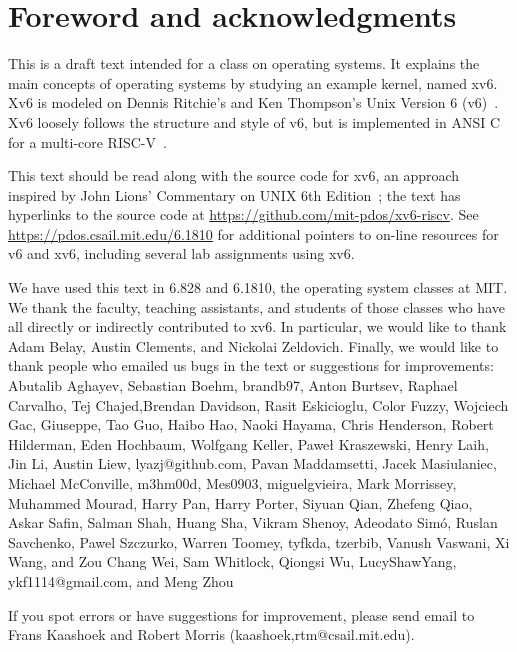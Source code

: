 \chapter*{Foreword and acknowledgments}


This is a draft text intended for a class on operating systems. It
explains the main concepts of operating systems by studying an example
kernel, named xv6.  Xv6 is modeled on Dennis Ritchie's and
Ken Thompson's Unix Version 6 (v6)~\cite{unix}.  Xv6 loosely follows the structure
and style of v6, but is implemented in ANSI C~\cite{kernighan} for 
a multi-core RISC-V~\cite{riscv}.

This text should be read along with the source code for xv6, an
approach inspired by John Lions' Commentary on UNIX 6th
Edition~\cite{lions}; the text has hyperlinks to the source code at
\url{https://github.com/mit-pdos/xv6-riscv}. See
\url{https://pdos.csail.mit.edu/6.1810} for additional pointers to
on-line resources for v6 and xv6, including several lab assignments
using xv6.

We have used this text in 6.828 and 6.1810, the operating system
classes at MIT.  We thank the faculty, teaching assistants, and
students of those classes who have all directly or indirectly
contributed to xv6.  In particular, we would like to thank Adam Belay,
Austin Clements, and Nickolai Zeldovich.  Finally, we would like to
thank people who emailed us bugs in the text or suggestions for
improvements: Abutalib Aghayev, Sebastian Boehm, brandb97, Anton
Burtsev, Raphael Carvalho, Tej Chajed,Brendan Davidson, Rasit
Eskicioglu, Color Fuzzy, Wojciech Gac, Giuseppe, Tao Guo, Haibo Hao,
Naoki Hayama, Chris Henderson, Robert Hilderman, Eden Hochbaum,
Wolfgang Keller, Paweł Kraszewski, Henry Laih, Jin Li, Austin Liew,
lyazj@github.com, Pavan Maddamsetti, Jacek Masiulaniec, Michael
McConville, m3hm00d, Mes0903, miguelgvieira, Mark Morrissey, Muhammed Mourad,
Harry Pan, Harry Porter, Siyuan Qian, Zhefeng Qiao, Askar Safin,
Salman Shah, Huang Sha, Vikram Shenoy, Adeodato Simó, Ruslan
Savchenko, Pawel Szczurko, Warren Toomey, tyfkda, tzerbib, Vanush
Vaswani, Xi Wang, and Zou Chang Wei, Sam Whitlock, Qiongsi Wu,
LucyShawYang, ykf1114@gmail.com, and Meng Zhou

If you spot errors or have suggestions for improvement, please send email to
Frans Kaashoek and Robert Morris (kaashoek,rtm@csail.mit.edu).
